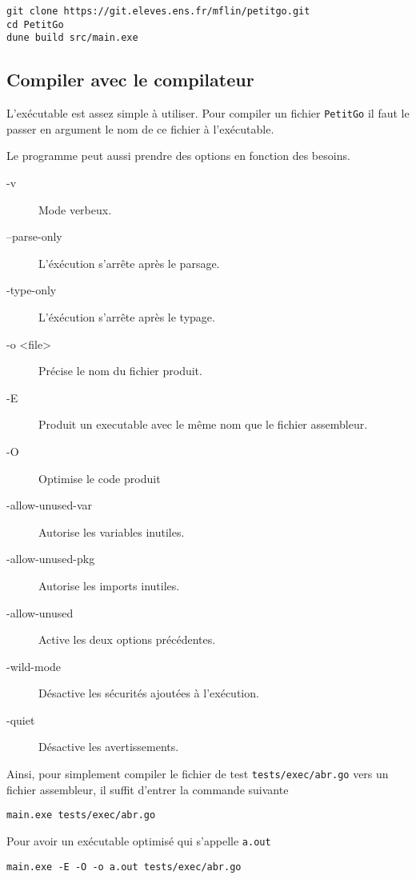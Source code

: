 \documentclass[11pt]{article}
\begin{document}
\begin{verbatim}
git clone https://git.eleves.ens.fr/mflin/petitgo.git
cd PetitGo
dune build src/main.exe
\end{verbatim}

\subsection{Compiler avec le compilateur\label{sec:exec}}

L'exécutable est assez simple à utiliser. Pour compiler un fichier \texttt{PetitGo} il faut le passer en argument le nom de ce fichier à l'exécutable.

Le programme peut aussi prendre des options en fonction des besoins.

\begin{description}
\item[-v] Mode verbeux.
\item[--\-parse-only] L'éxécution s'arrête après le parsage.
\item[-\-type-only] L'éxécution s'arrête après le typage.
\item[-o <file>] Précise le nom du fichier produit.
\item[-E] Produit un executable avec le même nom que le fichier assembleur.
\item[-O] Optimise le code produit
\item[-\-allow-unused-var] Autorise les variables inutiles.
\item[-\-allow-unused-pkg] Autorise les imports inutiles.
\item[-\-allow-unused] Active les deux options précédentes.
\item[-\-wild-mode] Désactive les sécurités ajoutées à l'exécution.
\item[-\-quiet] Désactive les avertissements.
\end{description}

Ainsi, pour simplement compiler le fichier de test \texttt{tests/exec/abr.go} vers un fichier assembleur, il suffit d'entrer la commande suivante

\begin{verbatim}
main.exe tests/exec/abr.go
\end{verbatim}

Pour avoir un exécutable optimisé qui s'appelle \texttt{a.out}

\begin{verbatim}
main.exe -E -O -o a.out tests/exec/abr.go
\end{verbatim}
\end{document}
